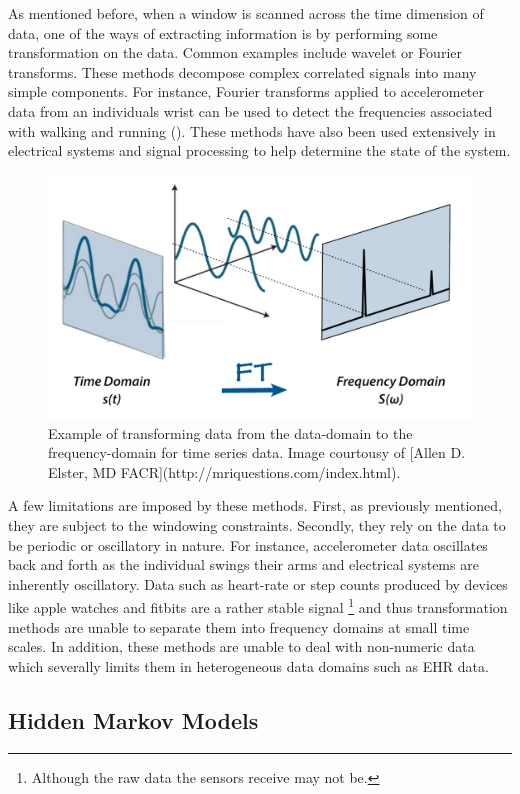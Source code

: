 \documentclass[]{book}
\let\rmarkdownfootnote\footnote%
\def\footnote{\protect\rmarkdownfootnote}
\theoremstyle{definition}
\theoremstyle{definition}
\theoremstyle{definition}
\theoremstyle{remark}
\begin{document}
As mentioned before, when a window is scanned across the time dimension
of data, one of the ways of extracting information is by performing some
transformation on the data. Common examples include wavelet or Fourier
transforms. These methods decompose complex correlated signals into many
simple components. For instance, Fourier transforms applied to
accelerometer data from an individuals wrist can be used to detect the
frequencies associated with walking and running
(\citet{accelerometer_activity}). These methods have also been used
extensively in electrical systems and signal processing to help
determine the state of the system.

\begin{figure}

{\centering \includegraphics[width=0.6\linewidth]{figures/fourier_transform} 

}

\caption{Example of transforming data from the data-domain to the frequency-domain for time series data. Image courtousy of [Allen D. Elster, MD FACR](http://mriquestions.com/index.html).}\label{fig:fouriertransform}
\end{figure}

A few limitations are imposed by these methods. First, as previously
mentioned, they are subject to the windowing constraints. Secondly, they
rely on the data to be periodic or oscillatory in nature. For instance,
accelerometer data oscillates back and forth as the individual swings
their arms and electrical systems are inherently oscillatory. Data such
as heart-rate or step counts produced by devices like apple watches and
fitbits are a rather stable signal \footnote{Although the raw data the
  sensors receive may not be.} and thus transformation methods are
unable to separate them into frequency domains at small time scales. In
addition, these methods are unable to deal with non-numeric data which
severally limits them in heterogeneous data domains such as EHR data.

\subsection{Hidden Markov Models}\label{hidden-markov-models}
\end{document}
